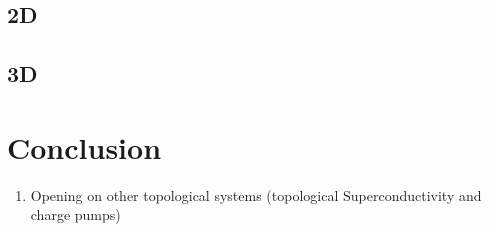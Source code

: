 {\subsection{\label{sec:ti_exemples_2D} 2D}
\subsection{\label{sec:ti_exemples_3D} 3D}

\section{\label{sec:concl} Conclusion}
\begin{enumerate}
    \item Opening on other topological systems (topological Superconductivity and charge pumps)\\[0.5cm]
\end{enumerate}

}

\cite{sato_topological_2017}
\cite{ghadimi_topological_2021}
\cite{xiao_berry_2010}
\cite{hasan_topological_2010}
\cite{noauthor_topological_2013}
\cite{sun_quantum_2017}
\cite{chang_x_nodate}
\cite{kane_topological_2013}
\cite{bisharat_photonic_nodate}
\cite{ando_topological_2013}







